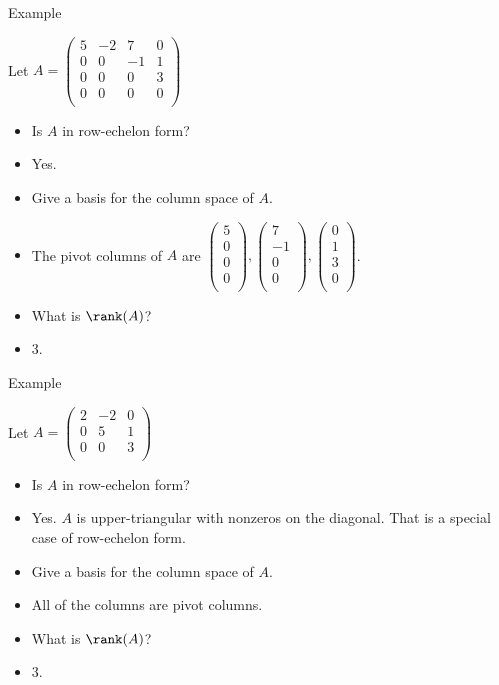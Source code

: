 \documentclass{beamer}
\begin{document}
\begin{frame}{Example}

Let
$
A=
\begin{pmatrix}
5 & -2 &  7  & 0 \\
0 & 0  & -1  & 1 \\
0 & 0  &  0  & 3 \\
0 & 0  &  0  & 0 \\
\end{pmatrix}
$
\begin{itemize}
\item Is $A$ in row-echelon form?
\item Yes.
\item Give a basis for the column space of $A$.
\item The pivot columns of $A$ are
$
\begin{pmatrix}
5 \\
0 \\
0 \\
0 \\
\end{pmatrix},
\begin{pmatrix}
 7 \\
-1 \\
 0 \\
 0 \\
\end{pmatrix},
\begin{pmatrix}
0 \\
1 \\
3 \\
0 \\
\end{pmatrix}
$.
\item What is $\rank(A)$?
\item 3.
\end{itemize}

\end{frame}


\begin{frame}{Example}

Let
$
A=
\begin{pmatrix}
2 & -2 &  0 \\
0 & 5  &  1 \\
0 & 0  &  3 \\
\end{pmatrix}
$
\begin{itemize}
\item Is $A$ in row-echelon form?
\item Yes. $A$ is upper-triangular with nonzeros on the diagonal.
That is a special case of row-echelon form.
\item Give a basis for the column space of $A$.
\item All of the columns are pivot columns.
\item What is $\rank(A)$?
\item 3.
\end{itemize}

\end{frame}
\end{document}
